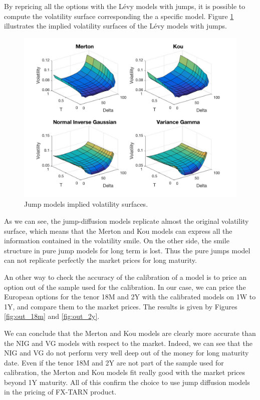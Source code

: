 By repricing all the options with the L\'evy models with jumps, it is possible to compute the volatility surface corresponding the a specific model. Figure \ref{fig:vol_models} illustrates the implied volatility surfaces of the L\'evy models with jumps. 
\begin{figure}[!htb]
\centering
	\includegraphics[width=\textwidth]{gfx/vol_models}
	\caption{Jump models implied volatility surfaces.}
	\label{fig:vol_models}
\end{figure}

As we can see, the jump-diffusion models replicate almost the original volatility surface, which means that the Merton and Kou models can express all the information contained in the volatility smile. On the other side, the smile structure in pure jump models for long term is lost. Thus the pure jumps model can not replicate perfectly the market prices for long maturity.

An other way to check the accuracy of the calibration of a model is to price an option out of the sample used for the calibration. In our case, we can price the European options for the tenor 18M and 2Y with the calibrated models on 1W to 1Y, and compare them to the market prices. The results is given by Figures \ref{fig:out_18m} and \ref{fig:out_2y}.

We can conclude that the Merton and Kou models are clearly more accurate than the NIG and VG models with respect to the market. Indeed, we can see that the NIG and VG do not perform very well deep out of the money for long maturity date. Even if the tenor 18M and 2Y are not part of the sample used for calibration, the Merton and Kou models fit really good with the market prices beyond 1Y maturity. All of this confirm the choice to use jump diffusion models in the pricing of FX-TARN product.

